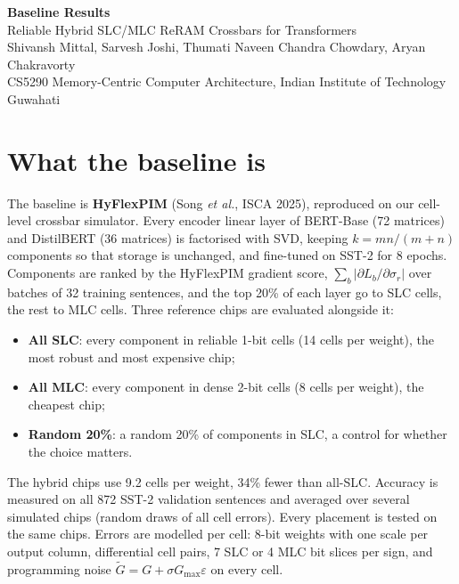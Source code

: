 \documentclass[10pt,a4paper]{article}
\begin{document}
\begin{center}
{\LARGE\bfseries Baseline Results}\\[4pt]
{\large Reliable Hybrid SLC/MLC ReRAM Crossbars for Transformers}\\[4pt]
Shivansh Mittal, Sarvesh Joshi, Thumati Naveen Chandra Chowdary, Aryan Chakravorty\\
CS5290 Memory-Centric Computer Architecture, Indian Institute of Technology Guwahati
\end{center}

\section{What the baseline is}
The baseline is \textbf{HyFlexPIM} (Song \emph{et al.}, ISCA 2025), reproduced on our cell-level crossbar
simulator. Every encoder linear layer of BERT-Base (72 matrices) and DistilBERT (36 matrices) is factorised
with SVD, keeping $k=mn/(m+n)$ components so that storage is unchanged, and fine-tuned on SST-2 for 8
epochs. Components are ranked by the HyFlexPIM gradient score, $\sum_b|\partial L_b/\partial\sigma_r|$ over
batches of 32 training sentences, and the top 20\% of each layer go to SLC cells, the rest to MLC cells.
Three reference chips are evaluated alongside it:
\begin{itemize}
\item \textbf{All SLC}: every component in reliable 1-bit cells (14 cells per weight), the most robust and most
expensive chip;
\item \textbf{All MLC}: every component in dense 2-bit cells (8 cells per weight), the cheapest chip;
\item \textbf{Random 20\%}: a random 20\% of components in SLC, a control for whether the choice matters.
\end{itemize}
The hybrid chips use 9.2 cells per weight, 34\% fewer than all-SLC. Accuracy is measured on all 872 SST-2
validation sentences and averaged over several simulated chips (random draws of all cell errors). Every
placement is tested on the same chips. Errors are modelled per cell: 8-bit weights with one scale per output
column, differential cell pairs, 7 SLC or 4 MLC bit slices per sign, and programming noise
$\tilde G=G+\sigma G_{\max}\varepsilon$ on every cell.
\end{document}
